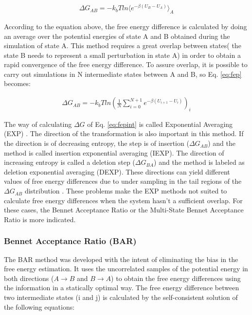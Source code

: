 \begin{equation}
\label{eq:fep}
\begin{aligned}
\Delta G_{AB} = -k_{b}T ln \langle{e^{-\beta (U_{B}-U_{A})}}\rangle_{A}
\end{aligned}
\end{equation}

According to the equation above, the free energy difference is calculated by doing an average over the potential energies of state A and B obtained during the simulation of state A. This method requires a great overlap between states( the state B needs to represent a small perturbation in state A) in order to obtain a rapid convergence of the free energy difference. To assure overlap, it is possible to carry out simulations in N intermediate states between A and B, so Eq. \eqref{eq:fep} becomes:

\begin{equation}
\label{eq:fepint}
\begin{aligned}
\Delta G_{AB} = -k_{b}T  ln \left(\frac{1}{N}\sum_{i=0}^{N+1}
{e^{-\beta (U_{i+1}-U_{i})}}\right)_{i}
\end{aligned}
\end{equation}

The way of calculating $\Delta G$ of Eq. \eqref{eq:fepint} is called Exponential Averaging (EXP) \cite{zwanzig1955,bareva}. The direction of the transformation is also important in this method. If the direction is of decreasing entropy, the step is of insertion ($\Delta G_{AB}$) and the method is called insertion exponential averaging (IEXP). The direction of increasing entropy is  called a deletion step ($\Delta G_{BA}$) and the method is labeled as deletion exponential averaging (DEXP). These directions can yield different values of free energy differences due to under sampling in the tail regions of the $\Delta G_{AB}$ distribution \cite{klimovich,pohorille2010}. These problems make the EXP methods not suited to calculate free energy differences when the system hasn't a sufficient overlap. For these cases, the Bennet Acceptance Ratio or the Multi-State Bennet Acceptance Ratio is more indicated.   

\subsubsection{Bennet Acceptance Ratio (BAR)}

The BAR method \cite{bennet1976} was developed with the intent of eliminating the bias in the free energy estimation. It uses the uncorrelated samples of the potential energy in both directions ($A \rightarrow B$ and $B \rightarrow A$) to obtain the free energy differences using the information in a statically optimal way. The free energy difference between two intermediate states (i and j) is calculated by the self-consistent solution of the following equations: 

